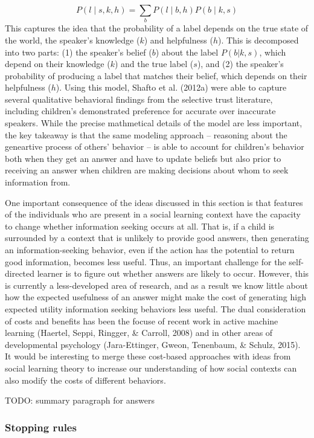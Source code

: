 \documentclass[english,floatsintext,man]{apa6}
\theoremstyle{definition}
\theoremstyle{definition}
\theoremstyle{definition}
\theoremstyle{remark}
\begin{document}
\[P(l \mid s,k,h) = \sum_b P(l \mid b,h)P(b \mid k,s)\] This captures
the idea that the probability of a label depends on the true state of
the world, the speaker's knowledge (\(k\)) and helpfulness (\(h\)). This
is decomposed into two parts: (1) the speaker's belief (\(b\)) about the
label \(P(b|k,s)\), which depend on their knowledge (\(k\)) and the true
label (\(s\)), and (2) the speaker's probability of producing a label
that matches their belief, which depends on their helpfulness (\(h\)).
Using this model, Shafto et al. (2012a) were able to capture several
qualitative behavioral findings from the selective trust literature,
including children's demonstrated preference for accurate over
inaccurate speakers. While the precise mathmetical details of the model
are less important, the key takeaway is that the same modeling approach
-- reasoning about the geneartive process of others' behavior -- is able
to account for children's behavior both when they get an answer and have
to update beliefs but also prior to receiving an answer when children
are making decisions about whom to seek information from.

One important consequence of the ideas discussed in this section is that
features of the individuals who are present in a social learning context
have the capacity to change whether information seeking occurs at all.
That is, if a child is surrounded by a context that is unlikely to
provide good answers, then generating an information-seeking behavior,
even if the action has the potential to return good information, becomes
less useful. Thus, an important challenge for the self-directed learner
is to figure out whether answers are likely to occur. However, this is
currently a less-developed area of research, and as a result we know
little about how the expected usefulness of an answer might make the
cost of generating high expected utility information seeking behaviors
less useful. The dual consideration of costs and benefits has been the
focuse of recent work in active machine learning (Haertel, Seppi,
Ringger, \& Carroll, 2008) and in other areas of developmental
psychology (Jara-Ettinger, Gweon, Tenenbaum, \& Schulz, 2015). It would
be interesting to merge these cost-based approaches with ideas from
social learning theory to increase our understanding of how social
contexts can also modify the costs of different behaviors.

TODO: summary paragraph for answers

\subsubsection{Stopping rules}\label{stopping-rules}
\end{document}
